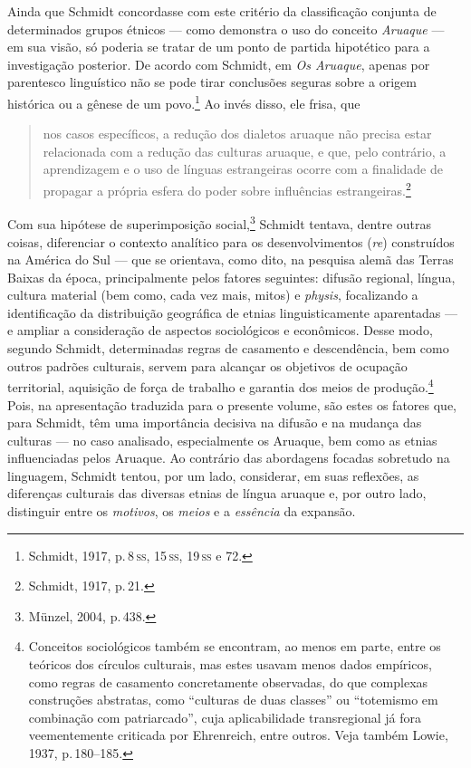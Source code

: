 Ainda que Schmidt concordasse com este critério da classificação
conjunta de determinados grupos étnicos --- como demonstra o uso do
conceito \textit{Aruaque} --- em sua visão, só poderia se tratar de um ponto
de partida hipotético para a investigação posterior. De acordo com
Schmidt, em \textit{Os Aruaque}, apenas por parentesco linguístico não se
pode tirar conclusões seguras sobre a origem histórica ou a gênese de um
povo.\footnote{Schmidt, 1917, p.\,8\,\textsc{ss}, 15\,\textsc{ss}, 19\,\textsc{ss} e 72.} Ao invés disso, ele frisa, que


\begin{quote}
nos casos específicos, a redução dos dialetos aruaque não precisa estar
relacionada com a redução das culturas aruaque, e que, pelo contrário, a
aprendizagem e o uso de línguas estrangeiras ocorre com a finalidade de
propagar a própria esfera do poder sobre influências
estrangeiras.\footnote{Schmidt, 1917, p.\,21.} %
\end{quote}

Com sua hipótese de superimposição social,\footnote{Münzel, 2004, p.\,438.}
Schmidt tentava, dentre outras coisas, diferenciar o contexto analítico
para os desenvolvimentos (\textit{re}) construídos na América do Sul --- que se
orientava, como dito, na pesquisa alemã das Terras Baixas da época,
principalmente pelos fatores seguintes: difusão regional, língua,
cultura material (bem como, cada vez mais, mitos) e \textit{physis},
focalizando a identificação da distribuição geográfica de etnias
linguisticamente aparentadas --- e ampliar a consideração de aspectos
sociológicos e econômicos. Desse modo, segundo Schmidt, determinadas
regras de casamento e descendência, bem como outros padrões culturais,
servem para alcançar os objetivos de ocupação territorial, aquisição de
força de trabalho e garantia dos meios de produção.\footnote{Conceitos
  sociológicos também se encontram, ao menos em parte, entre os teóricos
  dos círculos culturais, mas estes usavam menos dados empíricos, como
  regras de casamento concretamente observadas, do que complexas
  construções abstratas, como ``culturas de duas classes'' ou
  ``totemismo em combinação com patriarcado'', cuja aplicabilidade
  transregional já fora veementemente criticada por Ehrenreich, entre
  outros. Veja também Lowie, 1937, p.\,180--185.} Pois, na apresentação
traduzida para o presente volume, são estes os fatores que, para
Schmidt, têm uma importância decisiva na difusão e na mudança das
culturas --- no caso analisado, especialmente os Aruaque, bem como as
etnias influenciadas pelos Aruaque. Ao contrário das abordagens focadas
sobretudo na linguagem, Schmidt tentou, por um lado, considerar, em
suas reflexões, as diferenças culturais das diversas etnias de língua
aruaque e, por outro lado, distinguir entre os \textit{motivos}, os \textit{meios}
e a \textit{essência} da expansão.

